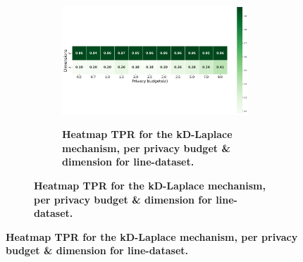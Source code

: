 \newpage
\begin{figure}[H]
    \centering
    \begin{subfigure}[b]{0.9\textwidth}
        \begin{subfigure}[c]{1\textwidth}
            \caption{\textbf{Heatmap TPR for the kD-Laplace mechanism, per privacy budget \& dimension for line-dataset.}}
            \includegraphics[width=1\textwidth]{Results/kd-laplace/kd-Laplace/line-dataset/tpr.png}
            \label{fig:privacy_tpr_line-dataset_adversial_advantage_kd-laplace}
        \end{subfigure}
        \vfill %


\end{subfigure}
\end{figure}
